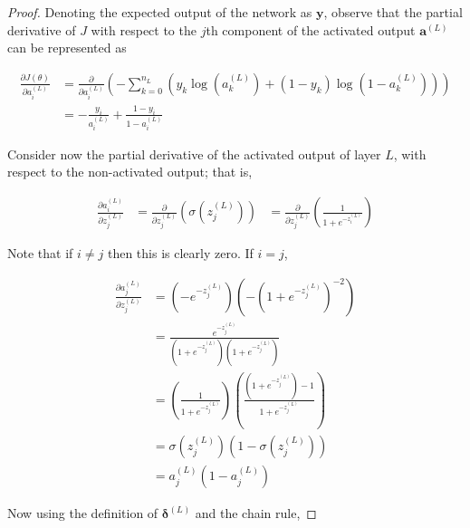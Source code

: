 \documentclass{article}[11pt]
\begin{document}
        
        \begin{proof}
            
            Denoting the expected output of the network as $\mathbf{y}$, observe that the partial derivative of $J$ with respect to the $j$th component of the activated output $\mathbf{a}^{(L)}$ can be represented as
                    
            $$ \begin{aligned}
            \frac{\partial J(\theta)}{\partial a^{(L)}_i}
            &= \frac{\partial}{\partial a^{(L)}_i} \left( - \sum_{k=0}^{n_L} \left( y_k \log(a^{(L)}_k) + (1 - y_k) \log(1 - a^{(L)}_k) \right) \right) \\
            &= - \frac{y_i}{a^{(L)}_i} + \frac{1 - y_i}{1 - a^{(L)}_i}
            \end{aligned} $$
            
            Consider now the partial derivative of the activated output of layer $L$, with respect to the non-activated output; that is,
            
            $$ \begin{aligned}
            \frac{\partial a^{(L)}_i}{\partial z^{(L)}_j}
            &= \frac{\partial}{\partial z^{(L)}_j} \left( \sigma(z^{(L)}_j) \right)
            &= \frac{\partial}{\partial z^{(L)}_j} \left( \frac{1}{1 + e^{-z^{(L)}_i}} \right)
            \end{aligned} $$
                
            Note that if $i \neq j$ then this is clearly zero. If $i = j$,
            
            $$ \begin{aligned}
            \frac{\partial a^{(L)}_j}{\partial z^{(L)}_j}
            &= \left( - e^{-z^{(L)}_j} \right) \left( - \left( 1 + e^{-z^{(L)}_j} \right)^{-2} \right) \\
            &= \frac{e^{-z^{(L)}_j}}{\left( 1 + e^{-z^{(L)}_j} \right) \left( 1 + e^{-z^{(L)}_j} \right)} \\
            &= \left( \frac{1}{1 + e^{-z^{(L)}_j}} \right) \left( \frac{\left( 1 + e^{-z^{(L)}_j} \right) - 1}{1 + e^{-z^{(L)}_j}} \right) \\
            &= \sigma(z^{(L)}_j) \left( 1 - \sigma(z^{(L)}_j) \right) \\
            &= a^{(L)}_j \left( 1 - a^{(L)}_j \right)
            \end{aligned} $$
            
            Now using the definition of $\boldsymbol{\delta}^{(L)}$ and the chain rule,
            

\end{proof}
\end{document}
